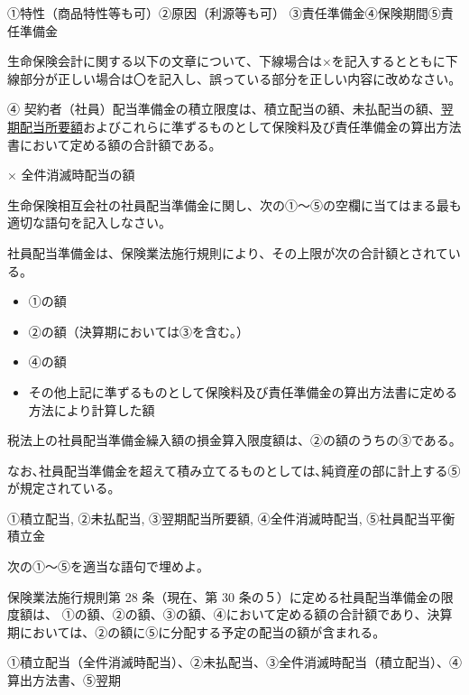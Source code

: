 \documentclass[report,gutter=10mm,fore-edge=10mm,uplatex,dvipdfmx]{jlreq}
\begin{document}

①特性（商品特性等も可）②原因（利源等も可）
③責任準備金④保険期間⑤責任準備金


生命保険会計に関する以下の文章について、下線場合は×を記入するとともに下線部分が正しい場合は〇を記入し、誤っている部分を正しい内容に改めなさい。

④
契約者（社員）配当準備金の積立限度は、積立配当の額、未払配当の額、\underline{翌期配当所要額}およびこれらに準ずるものとして保険料及び責任準備金の算出方法書において定める額の合計額である。


× 全件消滅時配当の額



生命保険相互会社の社員配当準備金に関し、次の①～⑤の空欄に当てはまる最も適切な語句を記入しなさい。

社員配当準備金は、保険業法施行規則により、その上限が次の合計額とされている。
\begin{itemize}
 \item ①の額 
 \item ②の額（決算期においては③を含む｡） 
 \item ④の額
 \item その他上記に準ずるものとして保険料及び責任準備金の算出方法書に定める方法により計算した額
\end{itemize}

税法上の社員配当準備金繰入額の損金算入限度額は、②の額のうちの③である。

なお､社員配当準備金を超えて積み立てるものとしては､純資産の部に計上する⑤が規定されている。


①積立配当, ②未払配当, ③翌期配当所要額, ④全件消滅時配当,
⑤社員配当平衡積立金



次の①～⑤を適当な語句で埋めよ。

保険業法施行規則第 28 条（現在、第 30
条の５）に定める社員配当準備金の限度額は、
①の額、②の額、③の額、④において定める額の合計額であり、決算期においては、②の額に⑤に分配する予定の配当の額が含まれる。


①積立配当（全件消滅時配当）、②未払配当、③全件消滅時配当（積立配当）、④算出方法書、⑤翌期


\end{document}

